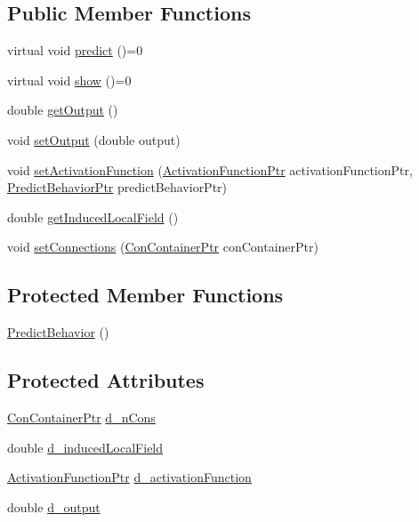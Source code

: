 \subsection*{Public Member Functions}
\begin{DoxyCompactItemize}
\item 
virtual void \hyperlink{class_predict_behavior_a7db41238d6d1dbf60c67cf8575e79885}{predict} ()=0
\item 
virtual void \hyperlink{class_predict_behavior_a9ef84360f73784248d994fa4707c1dde}{show} ()=0
\item 
double \hyperlink{class_predict_behavior_ac07dbe00c03788119df5df9f57ce11e5}{getOutput} ()
\item 
void \hyperlink{class_predict_behavior_afeabe1f543e46d41909b41816d8210a6}{setOutput} (double output)
\item 
void \hyperlink{class_predict_behavior_a996642f65ce5f5933854039981b66b56}{setActivationFunction} (\hyperlink{_a_m_o_r_e_8h_a77602a0277a02e5769c3df0adc669b17}{ActivationFunctionPtr} activationFunctionPtr, \hyperlink{_a_m_o_r_e_8h_a1fb2f1f8fdf1e08c42ef4bdce436af93}{PredictBehaviorPtr} predictBehaviorPtr)
\item 
double \hyperlink{class_predict_behavior_a69187d626108f96e50675729828daf07}{getInducedLocalField} ()
\item 
void \hyperlink{class_predict_behavior_a0acf1564a1d50771e357dae05986f7b8}{setConnections} (\hyperlink{_a_m_o_r_e_8h_a1021dbaf961d1c8da6d58a8566e5778b}{ConContainerPtr} conContainerPtr)
\end{DoxyCompactItemize}
\subsection*{Protected Member Functions}
\begin{DoxyCompactItemize}
\item 
\hyperlink{class_predict_behavior_af0a2b23a6b860f470a3d7d22ce604689}{PredictBehavior} ()
\end{DoxyCompactItemize}
\subsection*{Protected Attributes}
\begin{DoxyCompactItemize}
\item 
\hyperlink{_a_m_o_r_e_8h_a1021dbaf961d1c8da6d58a8566e5778b}{ConContainerPtr} \hyperlink{class_predict_behavior_ae7d8e531771e06a855f4f1ade167f2f3}{d\_\-nCons}
\item 
double \hyperlink{class_predict_behavior_afdf6139d11c2c1336dd9402262dc1b5e}{d\_\-inducedLocalField}
\item 
\hyperlink{_a_m_o_r_e_8h_a77602a0277a02e5769c3df0adc669b17}{ActivationFunctionPtr} \hyperlink{class_predict_behavior_a60e5bf9ad1d151741a359cdd88346eb5}{d\_\-activationFunction}
\item 
double \hyperlink{class_predict_behavior_acae2a69a47c0af627fc17b9243148db2}{d\_\-output}
\end{DoxyCompactItemize}


